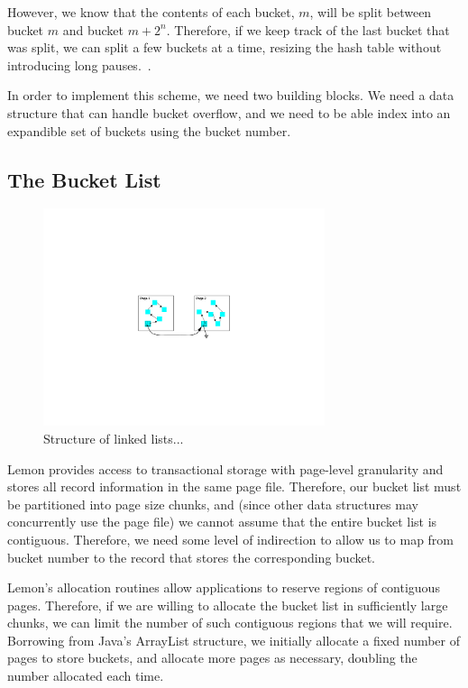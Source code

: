 \documentclass[letterpaper,twocolumn,english]{article}
\newcommand{\yad}{Lemon\xspace}
\begin{document}
However, 
we know that the
contents of each bucket, $m$, will be split between bucket $m$ and
bucket $m+2^{n}$. Therefore, if we keep track of the last bucket that
was split, we can split a few buckets at a time, resizing the hash
table without introducing long pauses.~\cite{lht}. 

In order to implement this scheme, we need two building blocks.  We
need a data structure that can handle bucket overflow, and we need to
be able index into an expandible set of buckets using the bucket
number.

\subsection{The Bucket List}

\begin{figure}
\includegraphics[width=3.25in]{LHT2.pdf}
\caption{\label{fig:LHT}Structure of linked lists...}
\end{figure}

\yad provides access to transactional storage with page-level
granularity and stores all record information in the same page file.
Therefore, our bucket list must be partitioned into page size chunks,
and (since other data structures may concurrently use the page file)
we cannot assume that the entire bucket list is contiguous.
Therefore, we need some level of indirection to allow us to map from
bucket number to the record that stores the corresponding bucket.

\yad's allocation routines allow applications to reserve regions of
contiguous pages.  Therefore, if we are willing to allocate the bucket
list in sufficiently large chunks, we can limit the number of such
contiguous regions that we will require.  Borrowing from Java's
ArrayList structure, we initially allocate a fixed number of pages to
store buckets, and allocate more pages as necessary, doubling the
number allocated each time.  
\end{document}

